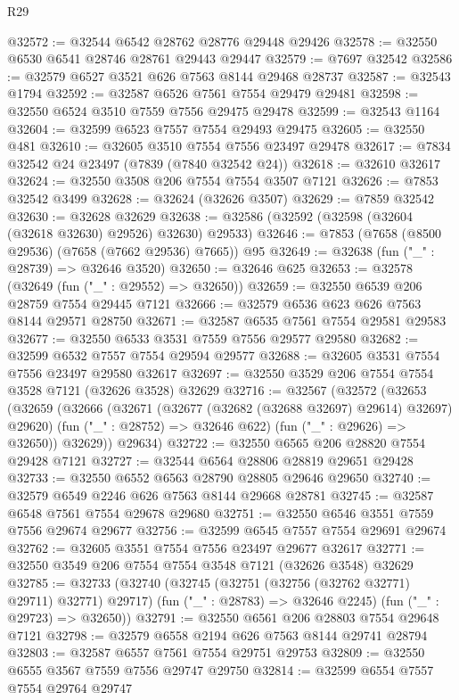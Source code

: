 \begin{lexlean}{R29}
\begin{coremodule}
@32572 := @32544 @6542 @28762 @28776 @29448 @29426
@32578 := @32550 @6530 @6541 @28746 @28761 @29443 @29447
@32579 := @7697 @32542
@32586 := @32579 @6527 @3521 @626 @7563 @8144 @29468 @28737
@32587 := @32543 @1794
@32592 := @32587 @6526 @7561 @7554 @29479 @29481
@32598 := @32550 @6524 @3510 @7559 @7556 @29475 @29478
@32599 := @32543 @1164
@32604 := @32599 @6523 @7557 @7554 @29493 @29475
@32605 := @32550 @481
@32610 := @32605 @3510 @7554 @7556 @23497 @29478
@32617 := @7834 @32542 @24 @23497 (@7839 (@7840 @32542 @24))
@32618 := @32610 @32617
@32624 := @32550 @3508 @206 @7554 @7554 @3507 @7121
@32626 := @7853 @32542 @3499
@32628 := @32624 (@32626 @3507)
@32629 := @7859 @32542
@32630 := @32628 @32629
@32638 := @32586 (@32592 (@32598 (@32604 (@32618 @32630) @29526) @32630) @29533)
@32646 := @7853 (@7658 (@8500 @29536) (@7658 (@7662 @29536) @7665)) @95
@32649 := @32638 (fun ("_" : @28739) => @32646 @3520)
@32650 := @32646 @625
@32653 := @32578 (@32649 (fun ("_" : @29552) => @32650))
@32659 := @32550 @6539 @206 @28759 @7554 @29445 @7121
@32666 := @32579 @6536 @623 @626 @7563 @8144 @29571 @28750
@32671 := @32587 @6535 @7561 @7554 @29581 @29583
@32677 := @32550 @6533 @3531 @7559 @7556 @29577 @29580
@32682 := @32599 @6532 @7557 @7554 @29594 @29577
@32688 := @32605 @3531 @7554 @7556 @23497 @29580 @32617
@32697 := @32550 @3529 @206 @7554 @7554 @3528 @7121 (@32626 @3528) @32629
@32716 := @32567
    (@32572
      (@32653
        (@32659
          (@32666
            (@32671 (@32677 (@32682 (@32688 @32697) @29614) @32697) @29620)
            (fun ("_" : @28752) => @32646 @622)
            (fun ("_" : @29626) => @32650))
          @32629))
      @29634)
@32722 := @32550 @6565 @206 @28820 @7554 @29428 @7121
@32727 := @32544 @6564 @28806 @28819 @29651 @29428
@32733 := @32550 @6552 @6563 @28790 @28805 @29646 @29650
@32740 := @32579 @6549 @2246 @626 @7563 @8144 @29668 @28781
@32745 := @32587 @6548 @7561 @7554 @29678 @29680
@32751 := @32550 @6546 @3551 @7559 @7556 @29674 @29677
@32756 := @32599 @6545 @7557 @7554 @29691 @29674
@32762 := @32605 @3551 @7554 @7556 @23497 @29677 @32617
@32771 := @32550 @3549 @206 @7554 @7554 @3548 @7121 (@32626 @3548) @32629
@32785 := @32733
    (@32740
      (@32745 (@32751 (@32756 (@32762 @32771) @29711) @32771) @29717)
      (fun ("_" : @28783) => @32646 @2245)
      (fun ("_" : @29723) => @32650))
@32791 := @32550 @6561 @206 @28803 @7554 @29648 @7121
@32798 := @32579 @6558 @2194 @626 @7563 @8144 @29741 @28794
@32803 := @32587 @6557 @7561 @7554 @29751 @29753
@32809 := @32550 @6555 @3567 @7559 @7556 @29747 @29750
@32814 := @32599 @6554 @7557 @7554 @29764 @29747

\end{coremodule}
\end{lexlean}
